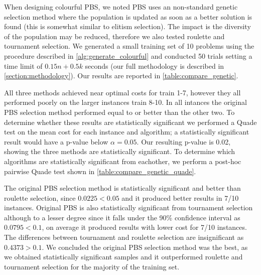 When designing colourful PBS, we noted PBS uses an non-standard genetic selection method where the population is updated as soon as a better solution is found (this is somewhat similar to elitism selection). The impact is the diversity of the population may be reduced, therefore we also tested roulette and tournament selection. We generated a small training set of 10 problems using the procedure described in \cref{alg:generate_colourful} and conducted 50 trials setting a time limit of $0.15n+0.5k$ seconds (our full methodology is described in \cref{section:methodology}). Our results are reported in \cref{table:compare_genetic}.



All three methods achieved near optimal costs for train 1-7, however they all performed poorly on the larger instances train 8-10. In all intances the original PBS selection method performed equal to or better than the other two. To determine whether these results are statistically significant we performed a Quade test on the mean cost for each instance and algorithm; a statistically significant result would have a p-value below $\alpha =0.05$. Our resulting p-value is 0.02, showing the three methods are statistically significant. To determine which algorithms are statistically significant from eachother, we perform a post-hoc pairwise Quade test shown in \cref{table:compare_genetic_quade}.



The original PBS selection method is statistically significant and better than roulette selection, since $0.0225<0.05$ and it produced better results in 7/10 instances. Original PBS is also statistically significant from tournament selection although to a lesser degree since it falls under the 90\% confidence interval as $0.0795<0.1$, on average it produced results with lower cost for 7/10 instances. The differences between tournament and roulette selection are insignificant as $0.4373>0.1$. We concluded the original PBS selection method was the best, as we obtained statistically significant samples and it outperformed roulette and tournament selection for the majority of the training set.